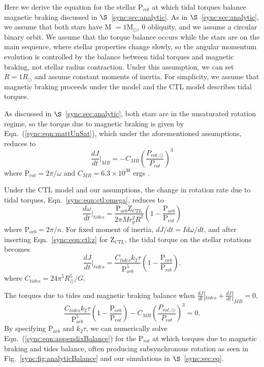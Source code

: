 Here we derive the equation for the stellar P$_{rot}$ at which tidal torques balance magnetic braking discussed in $\S$~\ref{sync:sec:analytic}. As in $\S$~\ref{sync:sec:analytic}, we assume that both stars have M $= 1$M$_{\odot}$, 0 obliquity, and we assume a circular binary orbit. We assume that the torque balance occurs while the stars are on the main sequence, where stellar properties change slowly, so the angular momentum evolution is controlled by the balance between tidal torques and magnetic braking, not stellar radius contraction. Under this assumption, we can set $R = 1 R_{\odot}$ and assume constant moments of inertia. For simplicity, we assume that magnetic braking proceeds under the \citet{Matt2015} model and the CTL model describes tidal torques.

As discussed in $\S$~\ref{sync:sec:analytic}, both stars are in the unsaturated rotation regime, so the torque due to magnetic braking is given by Eqn.~(\ref{sync:eqn:mattUnSat}), which under the aforementioned assumptions, reduces to
\begin{equation}
    \frac{dJ}{dt}\Bigg|_{MB} = -C_{MB} \left( \frac{P_{rot,\odot}}{P_{rot}} \right)^3
\end{equation}
where P$_{rot} = 2 \pi / \omega$ and $C_{MB} = 6.3 \times 10^{30}$ ergs \citep{Matt2015,Matt2019}.

Under the CTL model and our assumptions, the change in rotation rate due to tidal torques, Eqn.~\ref{sync:eqn:ctl:omega}, reduces to 
\begin{equation}
    \frac{d\omega}{dt}\Bigg|_{tides} = \frac{\mathrm{P}_{orb}\mathrm{Z}_{CTL}}{2 \pi M r_g^2 R^2}\left( 1 - \frac{\mathrm{P}_{orb}}{\mathrm{P}_{rot}} \right)
\end{equation}
where P$_{orb} = 2 \pi/n$.  For fixed moment of inertia, $dJ/dt =I d\omega/dt$, and after inserting Eqn.~\ref{sync:eqn:ctl:z} for Z$_{CTL}$, the tidal torque on the stellar rotations becomes
\begin{equation}
    \frac{dJ}{dt}\Bigg|_{tides} = \frac{C_{tides} k_2 \tau}{\mathrm{P}_{orb}^5}\left( 1 - \frac{\mathrm{P}_{orb}}{\mathrm{P}_{rot}} \right).
\end{equation}
where $C_{tides} = 24 \pi^5 R_{\odot}^5 / G$. 

The torques due to tides and magnetic braking balance when $ \frac{dJ}{dt}|_{tides} +  \frac{dJ}{dt}|_{MB} = 0$, 
\begin{equation} \label{sync:eqn:appendixBalance}
    \frac{C_{tides} k_2 \tau}{\mathrm{P}_{orb}^5}\left( 1 - \frac{\mathrm{P}_{orb}}{\mathrm{P}_{rot}} \right) -C_{MB} \left( \frac{P_{rot,\odot}}{P_{rot}} \right)^3 = 0.
\end{equation}
By specifying P$_{orb}$ and $k_2 \tau$, we can numerically solve Eqn.~(\ref{sync:eqn:appendixBalance}) for the P$_{rot}$ at which torques due to magnetic braking and tides balance, often producing subsynchronous rotation as seen in Fig.~\ref{sync:fig:analyticBalance} and our simulations in $\S$~\ref{sync:sec:eq}.